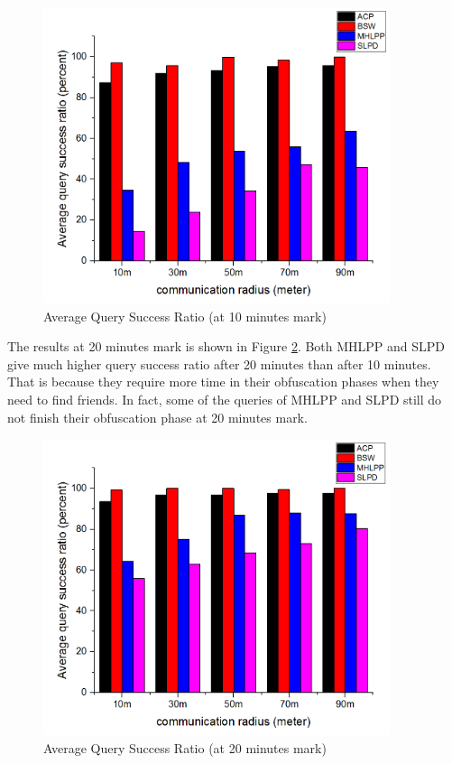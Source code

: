 \begin{figure} [H]
\centering 
\includegraphics[width=4.0in]{figures/F414AverageQuerySuccessRatio10minutes.png}
\caption{Average Query Success Ratio (at 10 minutes mark)} 
\label{fig:AverageQuerySuccessRatio10} %
\end{figure}

The results at 20 minutes mark is shown in Figure \ref{fig:AverageQuerySuccessRatio20}. Both MHLPP and SLPD give much higher query success ratio after 20 minutes than after 10 minutes. That is because they require more time in their obfuscation phases when they need to find friends. In fact, some of the queries of MHLPP and SLPD still do not finish their obfuscation phase at 20 minutes mark.

\begin{figure} [H]
\centering 
\includegraphics[width=4.0in]{figures/F415AverageQuerySuccessRatio20minutes.png}
\caption{Average Query Success Ratio (at 20 minutes mark)} 
\label{fig:AverageQuerySuccessRatio20} %
\end{figure}

